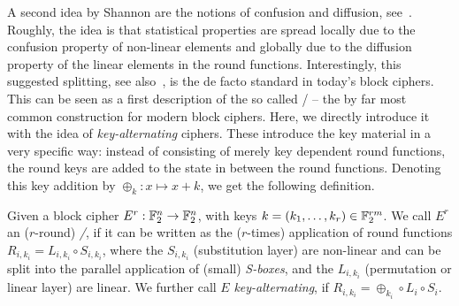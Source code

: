 A second idea by Shannon are the notions of confusion and diffusion, see~\cite[Section~35]{shannon45}.
Roughly, the idea is that statistical properties are spread locally due to the confusion property of non-linear elements and globally due to the diffusion property of the linear elements in the round functions.
Interestingly, this suggested splitting, see also~\cite[pp.~712f]{Shannon49}, is the de facto standard in today's block ciphers.
This can be seen as a first description of the so called \SPN/ -- the by far most common construction for modern block ciphers.
Here, we directly introduce it with the idea of \emph{key-alternating} ciphers.
These introduce the key material in a very specific way: instead of consisting of merely key dependent round functions, the round keys are added to the state in between the round functions.
Denoting this key addition by $\oplus_k : x \mapsto x + k$, we get the following definition.
\begin{definition}\label{def:spn}
    Given a block cipher $E^r : \mathbb{F}_2^n \to \mathbb{F}_2^n$, with keys $k = (k_1, \ldots, k_r) \in \mathbb{F}_2^{rm}$.
    We call $E^r$ an ($r$-round) \emph{\SPNf/}, if it can be written as the ($r$-times) application of round functions $R_{i, k_i} = L_{i,k_i} \circ S_{i,k_i}$, where the $S_{i,k_i}$ (substitution layer) are non-linear and can be split into the parallel application of (small) \emph{S-boxes}, and the $L_{i,k_i}$ (permutation or linear layer) are linear.
    We further call $E$ \emph{key-alternating}, if $R_{i,k_i} = \oplus_{k_i} \circ L_i \circ S_i$.
\end{definition}
